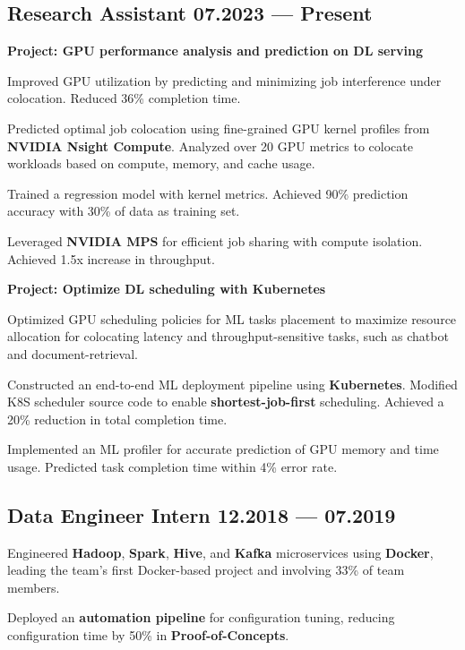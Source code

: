\subsection{{Research Assistant \hfill 07.2023 --- Present}}

\begin{zitemize}
        \item \textbf{Project: GPU performance analysis and prediction on DL serving}
        \item Improved GPU utilization by predicting and minimizing job interference under colocation. Reduced 36\% completion time. 
        \item Predicted optimal job colocation using fine-grained GPU kernel profiles from \textbf{NVIDIA Nsight Compute}. Analyzed over 20 GPU metrics to colocate workloads based on compute, memory, and cache usage.
        \item Trained a regression model with kernel metrics. Achieved 90\% prediction accuracy with 30\% of data as training set.
        \item Leveraged \textbf{NVIDIA MPS} for efficient job sharing with compute isolation. Achieved 1.5x increase in throughput.
\end{zitemize}
\vspace{-8pt}
\begin{zitemize}
        \item \textbf{Project: Optimize DL scheduling with Kubernetes}
        \item Optimized GPU scheduling policies for ML tasks placement to maximize resource allocation for colocating
latency and throughput-sensitive tasks, such as chatbot and document-retrieval.
        \item Constructed an end-to-end ML deployment pipeline using \textbf{Kubernetes}. Modified K8S scheduler source
        code to enable \textbf{shortest-job-first} scheduling. Achieved a 20\% reduction in total completion time.
        \item Implemented an ML profiler for accurate prediction of GPU memory and time usage. Predicted task
completion time within 4\% error rate.
\end{zitemize}

\subsection{{Data Engineer Intern \hfill 12.2018 --- 07.2019}}
\begin{zitemize}
        \item Engineered \textbf{Hadoop}, \textbf{Spark}, \textbf{Hive}, and \textbf{Kafka} microservices using \textbf{Docker}, leading the team’s first Docker-based project and involving 33\% of team members.
        \item Deployed an \textbf{automation pipeline} for configuration tuning, reducing configuration time by 50\% in \textbf{Proof-of-Concepts}.
\end{zitemize}

